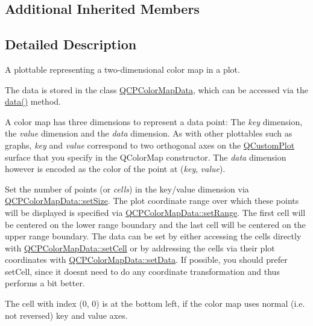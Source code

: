 \subsection*{Additional Inherited Members}


\subsection{Detailed Description}
A plottable representing a two-\/dimensional color map in a plot. 



The data is stored in the class \hyperlink{class_q_c_p_color_map_data}{Q\+C\+P\+Color\+Map\+Data}, which can be accessed via the \hyperlink{class_q_c_p_color_map_a3ae12c9ce842352037cd20ea5267414f}{data()} method.

A color map has three dimensions to represent a data point\+: The {\itshape key} dimension, the {\itshape value} dimension and the {\itshape data} dimension. As with other plottables such as graphs, {\itshape key} and {\itshape value} correspond to two orthogonal axes on the \hyperlink{class_q_custom_plot}{Q\+Custom\+Plot} surface that you specify in the Q\+Color\+Map constructor. The {\itshape data} dimension however is encoded as the color of the point at ({\itshape key}, {\itshape value}).

Set the number of points (or {\itshape cells}) in the key/value dimension via \hyperlink{class_q_c_p_color_map_data_a0d9ff35c299d0478b682bfbcdd9c097e}{Q\+C\+P\+Color\+Map\+Data\+::set\+Size}. The plot coordinate range over which these points will be displayed is specified via \hyperlink{class_q_c_p_color_map_data_aad9c1c7c703c1339489fc730517c83d4}{Q\+C\+P\+Color\+Map\+Data\+::set\+Range}. The first cell will be centered on the lower range boundary and the last cell will be centered on the upper range boundary. The data can be set by either accessing the cells directly with \hyperlink{class_q_c_p_color_map_data_a8e75eaf8746596319032a93f3d2d0683}{Q\+C\+P\+Color\+Map\+Data\+::set\+Cell} or by addressing the cells via their plot coordinates with \hyperlink{class_q_c_p_color_map_data_afd2083ccfd6987ec94aa7ef8e91ca39a}{Q\+C\+P\+Color\+Map\+Data\+::set\+Data}. If possible, you should prefer set\+Cell, since it doesn\textquotesingle{}t need to do any coordinate transformation and thus performs a bit better.

The cell with index (0, 0) is at the bottom left, if the color map uses normal (i.\+e. not reversed) key and value axes.

